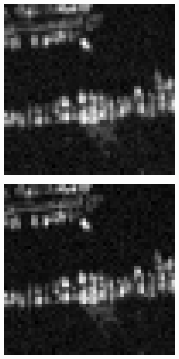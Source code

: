 \begin{figure}[t]
\centering
\begin{subfigure}{0.2\textwidth}
\includegraphics[width=\textwidth]{img/aliasedImg1L1}
\end{subfigure}%
\begin{subfigure}{0.2\textwidth}
\includegraphics[width=\textwidth]{img/aliasedImg1L2}

\end{subfigure}
\end{figure}
